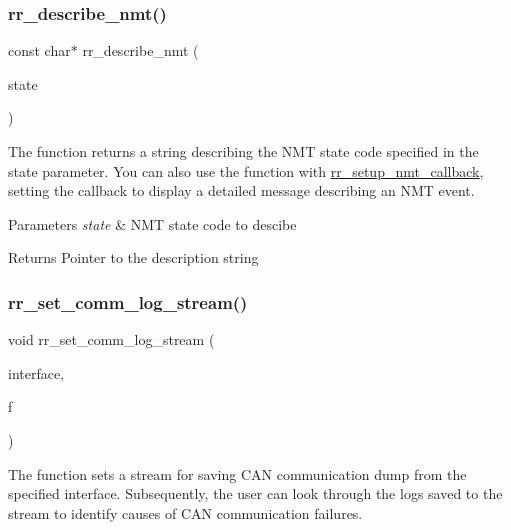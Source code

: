 \subsubsection{\texorpdfstring{rr\+\_\+describe\+\_\+nmt()}{rr\_describe\_nmt()}}
{\footnotesize\ttfamily const char$\ast$ rr\+\_\+describe\+\_\+nmt (\begin{DoxyParamCaption}\item[{\hyperlink{api_8h_afaf255d20b35be64a488b42e11feab29}{rr\+\_\+nmt\+\_\+state\+\_\+t}}]{state }\end{DoxyParamCaption})}



The function returns a string describing the N\+MT state code specified in the \textquotesingle{}state\textquotesingle{} parameter. You can also use the function with \hyperlink{group___utils_ga2433f49950ad40f06537287b52852c13}{rr\+\_\+setup\+\_\+nmt\+\_\+callback}, setting the callback to display a detailed message describing an N\+MT event. 


\begin{DoxyParams}{Parameters}
{\em state} & N\+MT state code to descibe \\
\hline
\end{DoxyParams}
\begin{DoxyReturn}{Returns}
Pointer to the description string 
\end{DoxyReturn}
\mbox{\label{group___utils_gaea43ac88d4b935bb3850a69a17462d31}} 
\subsubsection{\texorpdfstring{rr\+\_\+set\+\_\+comm\+\_\+log\+\_\+stream()}{rr\_set\_comm\_log\_stream()}}
{\footnotesize\ttfamily void rr\+\_\+set\+\_\+comm\+\_\+log\+\_\+stream (\begin{DoxyParamCaption}\item[{const \hyperlink{structrr__can__interface__t}{rr\+\_\+can\+\_\+interface\+\_\+t} $\ast$}]{interface,  }\item[{F\+I\+LE $\ast$}]{f }\end{DoxyParamCaption})}



The function sets a stream for saving C\+AN communication dump from the specified interface. Subsequently, the user can look through the logs saved to the stream to identify causes of C\+AN communication failures. 



